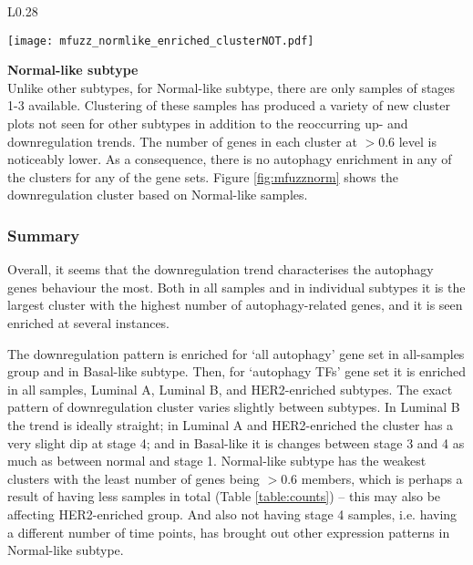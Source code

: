         
        \begin{wrapfigure}{L}{0.28\textwidth}
        \hfill
        \captionsetup{justification=centering}
        \centerline{ \texttt{[image: mfuzz\_normlike\_enriched\_clusterNOT.pdf]}}
        \vspace*{-8mm}
        \caption[Normal-like subtype downregulation cluster]{\label{fig:mfuzznorm}Normal-like\newline downregulation cluster}
        \end{wrapfigure}
      
        \textbf{Normal-like subtype}\\ 
        Unlike other subtypes, for Normal-like subtype, there are only samples of stages 1-3 available. Clustering of these samples has produced a variety of new cluster plots not seen for other subtypes in addition to the reoccurring up- and downregulation trends. The number of genes in each cluster at $>0.6$ level is noticeably lower.  As a consequence, there is no autophagy enrichment in any of the clusters for any of the gene sets. Figure \ref{fig:mfuzznorm} shows the downregulation cluster based on Normal-like samples. 
        \newline
        \newline
        \newline
        

    \subsubsection{Summary}
    
    Overall, it seems that the downregulation trend characterises the autophagy genes behaviour the most. Both in all samples and in individual subtypes it is the largest cluster with the highest number of autophagy-related genes, and it is seen enriched at several instances. 
    
    The downregulation pattern is enriched for ‘all autophagy' gene set in all-samples group and in Basal-like subtype. Then, for ‘autophagy TFs' gene set it is enriched in all samples, Luminal A, Luminal B, and HER2-enriched subtypes. The exact pattern of downregulation cluster varies slightly between subtypes. In Luminal B the trend is ideally straight; in Luminal A and HER2-enriched the cluster has a very slight dip at stage 4; and in Basal-like it is changes between stage 3 and 4 as much as between normal and stage 1. Normal-like subtype has the weakest clusters with the least number of genes being $>0.6$ members, which is perhaps a result of having less samples in total (Table \ref{table:counts}) -- this may also be affecting HER2-enriched group. And also not having stage 4 samples, i.e. having a different number of time points, has brought out other expression patterns in Normal-like subtype. 
    
